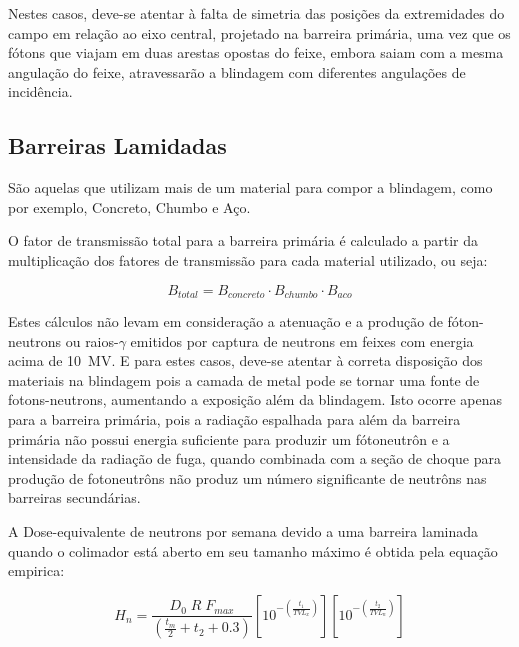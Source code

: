 \documentclass[11pt,a4paper]{article}
\newcounter{exemplo}
\begin{document}
                    Nestes casos, deve-se atentar à falta de simetria das posições da extremidades do campo em relação ao eixo central, projetado na barreira primária, uma vez que os fótons que viajam em duas arestas opostas do feixe, embora saiam com a mesma angulação do feixe, atravessarão a blindagem com diferentes angulações de incidência.  
            
        
        \subsection{Barreiras Lamidadas}
            
            São aquelas que utilizam mais de um material para compor a blindagem, como por exemplo, Concreto, Chumbo e Aço.

            O fator de transmissão total para a barreira primária é calculado a partir da multiplicação dos fatores de transmissão para cada material utilizado, ou seja:

            \begin{equation}
                B_{total} = B_{concreto} \cdot B_{chumbo} \cdot B_{aco}
            \end{equation}
            

            Estes cálculos não levam em consideração a atenuação e a produção de fóton-neutrons ou raios-$\gamma$ emitidos por captura de neutrons em feixes com energia acima de \qty{10}{MV}. E para estes casos, deve-se atentar à correta disposição dos materiais na blindagem pois a camada de metal pode se tornar uma fonte de fotons-neutrons, aumentando a exposição além da blindagem. Isto ocorre apenas para a barreira primária, pois a radiação espalhada para além da barreira primária não possui energia suficiente para produzir um fótoneutrôn e a intensidade da radiação de fuga, quando combinada com a seção de choque para produção de fotoneutrôns não produz um número significante de neutrôns nas barreiras secundárias.

            A Dose-equivalente de neutrons por semana devido a uma barreira laminada quando o colimador está aberto em seu tamanho máximo é obtida pela equação empirica:

            \begin{equation}
                H_n = \frac{D_0 \; R \; F_{max}}{\left(\frac{t_m}{2} + t_2 + 0.3\right)} 
                \left[10^{-\left(\frac{t_1}{TVL_x}\right)}\right]
                \left[10^{-\left(\frac{t_2}{TVL_n}\right)}\right]
            \end{equation}
\end{document}
